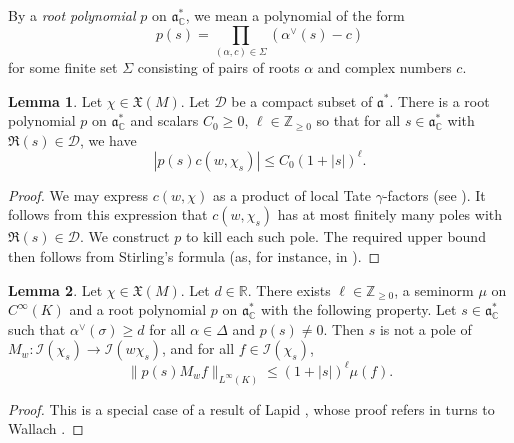 \documentclass[reqno]{amsart}
\theoremstyle{plain} \newtheorem{theorem} {Theorem}
\theoremstyle{definition} \newtheorem{definition} [theorem] {Definition}
\theoremstyle{itplain} %
\newtheorem{lemma}[theorem]{Lemma}
\numberwithin{equation}{section}
\numberwithin{theorem}{section}
\renewcommand{\geq}{\geqslant}
\renewcommand{\leq}{\leqslant}
\begin{document}
By a \emph{root polynomial} $p$ on $\mathfrak{a}_{\mathbb{C}}^*$, we mean a polynomial of the form
\begin{equation*}
  p(s) = \prod_{(\alpha,c) \in \Sigma}
  ( \alpha^\vee(s) - c  )
\end{equation*}
for some finite set $\Sigma$ consisting of pairs of roots $\alpha$ and complex numbers $c$.

\begin{lemma}\label{lem:jacquet-integral-uniformity-question:let-chi-in}
  Let $\chi \in \mathfrak{X}(M)$.  Let $\mathcal{D}$ be a compact subset of $\mathfrak{a}^*$.  There is a root polynomial $p$ on $\mathfrak{a}_{\mathbb{C}}^*$ and scalars $C_0 \geq 0$, $\ell \in \mathbb{Z}_{\geq 0}$ so that for all $s \in \mathfrak{a}_{\mathbb{C}}^*$ with $\Re(s) \in \mathcal{D}$, we have
  \begin{equation*}
    |p(s) c(w,\chi_s)| \leq C_0 (1 + |s|)^{\ell}.
  \end{equation*}
\end{lemma}
\begin{proof}
  We may express $c(w,\chi)$ as a product of local Tate $\gamma$-factors (see \cite[Thm 1]{MR816396}).  It follows from this expression that $c(w,\chi_s)$ has at most finitely many poles with $\Re(s) \in \mathcal{D}$.  We construct $p$ to kill each such pole.  The required upper bound then follows from Stirling's formula (as, for instance, in \cite[\S2.2]{2021arXiv210112106B}).
\end{proof}
\begin{lemma}\label{lem:jacquet-integral-uniformity-question:let-chi-in-1}
  Let $\chi \in \mathfrak{X}(M)$.  Let $d \in \mathbb{R}$.  There exists $\ell \in \mathbb{Z}_{\geq 0}$, a seminorm $\mu$ on $C^\infty(K)$ and a root polynomial $p$ on $\mathfrak{a}_{\mathbb{C}}^*$ with the following property.  Let $s \in \mathfrak{a}_{\mathbb{C}}^*$ such that $\alpha^\vee(\sigma) \geq d$ for all $\alpha \in \Delta$ and $p(s) \neq 0$.  Then $s$ is not a pole of $M_w : \mathcal{I}(\chi_s) \rightarrow \mathcal{I}(w \chi_s)$, and for all $f \in \mathcal{I}(\chi_s)$,
  \begin{equation*}
    \|p(s) M_w f\|_{L^\infty(K)} \leq  (1 + |s|)^{\ell} \mu(f).
  \end{equation*}
\end{lemma}
\begin{proof}
  This is a special case of a result of Lapid \cite[Cor 2]{MR2402686}, whose proof refers in turns to Wallach \cite[\S10.1.11]{MR1170566}.
\end{proof}
\end{document}
